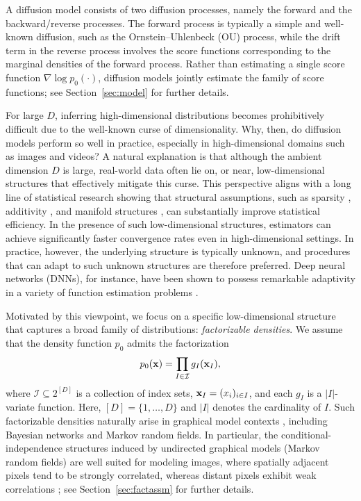 \documentclass[twoside,11pt]{article}
\def\cI{\mathcal I}
\newcommand{\bx}{{\bf x}}
\newcommand{\be}{\begin{equation}}
\newcommand{\ee}{\end{equation}}
\begin{document}
A diffusion model consists of two diffusion processes, namely the forward and the backward/reverse processes. The forward process is typically a simple and well-known diffusion, such as the Ornstein--Uhlenbeck (OU) process, while the drift term in the reverse process involves the score functions corresponding to the marginal densities of the forward process. Rather than estimating a single score function $\nabla \log p_{0}(\cdot)$, diffusion models \citep{sohl2015deep, ho2020denoising, song2019generative, song2021scorebased} jointly estimate the family of score functions; see Section~\ref{sec:model} for further details.



For large $D$, inferring high-dimensional distributions becomes prohibitively difficult due to the well-known curse of dimensionality.
Why, then, do diffusion models perform so well in practice, especially in high-dimensional domains such as images and videos? A natural explanation is that although the ambient dimension $D$ is large, real-world data often lie on, or near, low-dimensional structures that effectively mitigate this curse. This perspective aligns with a long line of statistical research showing that structural assumptions, such as sparsity \citep{hastie2015statistical}, additivity \citep{hastie1990generalized}, and manifold structures \citep{genovese2012minimax}, can substantially improve statistical efficiency. In the presence of such low-dimensional structures, estimators can achieve significantly faster convergence rates even in high-dimensional settings. In practice, however, the underlying structure is typically unknown, and procedures that can adapt to such unknown structures are therefore preferred.
Deep neural networks (DNNs), for instance, have been shown to possess remarkable adaptivity in a variety of function estimation problems \citep{imaizumi2022adaptive, schmidt2020nonparametric, tang2024adaptivity, chae2023likelihood}. 


Motivated by this viewpoint, we focus on a specific low-dimensional structure that captures a broad family of distributions: \emph{factorizable densities}.
We assume that the density function $p_{0}$ admits the factorization
\be \label{eq:factorization}
p_{0}(\bx) = \prod_{I \in \cI} g_{I}(\bx_{I}),
\ee
where $\cI \subseteq 2^{[D]}$ is a collection of index sets, $\bx_{I} = (x_{i})_{i \in I}$, and each $g_{I}$ is a $\lvert I \rvert$-variate function.
Here, $[D] = \{1, \ldots, D\}$ and $\lvert I \rvert$ denotes the cardinality of $I$. Such factorizable densities naturally arise in graphical model contexts \citep{liu2019nonparametric}, including Bayesian networks and Markov random fields.
In particular, the conditional-independence structures induced by undirected graphical models (Markov random fields) are well suited for modeling images, where spatially adjacent pixels tend to be strongly correlated, whereas distant pixels exhibit weak correlations \citep{ji2019probabilistic, vandermeulen2024dimension, vandermeulen2024breaking}; see Section~\ref{sec:factassm} for further details.
\end{document}
